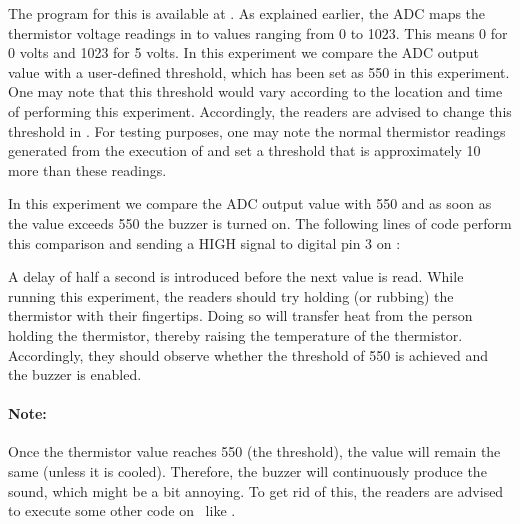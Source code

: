 \begin{enumerate}
        The program for this is available at
        .  As explained earlier,
        the ADC maps the thermistor voltage readings in to values
        ranging from 0 to 1023. This means 0 for 0 volts and 1023 for 5
        volts. In this experiment we compare the ADC output value with a user-defined
        threshold, which has been set as 550 in this experiment. One may note that
        this threshold would vary according to the location and time of performing
        this experiment. Accordingly, the readers are advised to change this threshold
        in . For testing purposes, one may note the
        normal thermistor readings generated from the execution of 
        and set a threshold that is approximately 10 more than these readings.

        In this experiment we compare the ADC output value with 550
        and as soon as the value exceeds 550 the buzzer is turned on. The following lines of code perform this
        comparison and sending a {HIGH} signal to digital pin 3 on \arduino:
        
        A delay of half a second is introduced
        before the next value is read. While running this experiment,
        the readers should try holding (or rubbing) the thermistor with their fingertips.
        Doing so will transfer heat from the person holding the
        thermistor, thereby raising the temperature of the thermistor.
        Accordingly, they should observe whether the threshold of 550 is achieved
        and the buzzer is enabled.

        \paragraph{Note:} Once the thermistor value reaches 550 (the threshold), the value will remain the same
        (unless it is cooled). Therefore, the buzzer will continuously produce the sound, which might be
        a bit annoying. To get rid of this, the readers are advised to
        execute some other code on \arduino\ like .

\end{enumerate}

